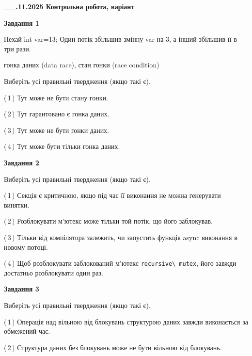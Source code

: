 \documentclass[12pt, ukrainian]{article}
\def\code#1{\Verb!#1!}
\begin{document}
\begin {large}

\textbf{\_\_.11.2025 Контрольна робота, варіант  }\par


{

\begin{center}
\textbf{Завдання 1}
\end{center}
Нехай int var=13; Один потік збільшив змінну var на 3, а інший збільшив її в три рази.

гонка даних (data race), стан гонки (race condition)

Виберіть усі правильні твердження (якщо такі є).\par
\vspace{2mm}
(\,1\,) Тут може не бути стану гонки.%

(\,2\,) Тут гарантовано є гонка даних.%

(\,3\,) Тут може не бути гонки даних.%

(\,4\,) Тут може бути тільки гонка даних.%



\begin{center}
\textbf{Завдання 2}
\end{center}
Виберіть усі правильні твердження (якщо такі є).\par
\vspace{2mm}

(\,1\,) Секція є критичною, якщо під час її виконання не можна генерувати винятки.%

(\,2\,) Розблокувати м’ютекс може тільки той потік, що його заблокував.%

(\,3\,) Тільки від компілятора залежить, чи запустить функція async виконання в новому потоці.%

(\,4\,) Щоб розблокувати заблокований м’ютекс \code{recursive\_mutex}, його завжди достатньо розблокувати один раз.%



\begin{center}
\textbf{Завдання 3}
\end{center}
Виберіть усі правильні твердження (якщо такі є).\par
\vspace{2mm}

(\,1\,) Операція над вільною від блокувань структурою даних завжди виконається за обмежений час.%

(\,2\,) Структура даних без блокувань може не бути вільною від блокувань.%

}
\end{large}
\end{document}
